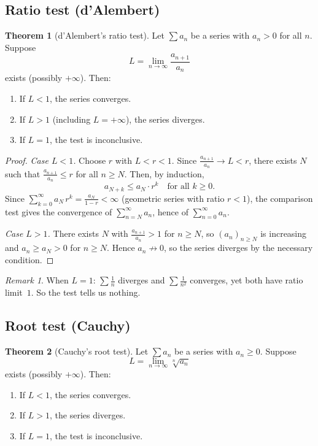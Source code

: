 \documentclass[12pt,a4paper,openany]{book}
\theoremstyle{definition}
\newtheorem{theorem}{Theorem}[chapter]
\theoremstyle{remark}
\newtheorem{remark}{Remark}[chapter]
\begin{document}
\subsection{Ratio test (d'Alembert)}\label{subsec:ratio}

\begin{theorem}[d'Alembert's ratio test]\label{thm:ratio-test}
Let $\sum a_n$ be a series with $a_n > 0$ for all $n$. Suppose
\[
   L = \lim_{n\to\infty}\frac{a_{n+1}}{a_n}
\]
exists (possibly $+\infty$). Then:
\begin{enumerate}
\item If $L < 1$, the series converges.
\item If $L > 1$ (including $L = +\infty$), the series diverges.
\item If $L = 1$, the test is inconclusive.
\end{enumerate}
\end{theorem}

\begin{proof}
\textit{Case $L < 1$.}
Choose $r$ with $L < r < 1$. Since $\frac{a_{n+1}}{a_n} \to L < r$,
there exists $N$ such that $\frac{a_{n+1}}{a_n} \leq r$ for all $n \geq N$.
Then, by induction,
\[
   a_{N+k} \leq a_N \cdot r^k \quad \text{for all } k \geq 0.
\]
Since $\sum_{k=0}^{\infty} a_N\, r^k = \frac{a_N}{1-r} < \infty$ (geometric
series with ratio $r < 1$), the comparison test gives the convergence of
$\sum_{n=N}^{\infty} a_n$, hence of $\sum_{n=0}^{\infty} a_n$.

\medskip
\textit{Case $L > 1$.}
There exists $N$ with $\frac{a_{n+1}}{a_n} > 1$ for $n \geq N$, so
$(a_n)_{n\geq N}$ is increasing and $a_n \geq a_N > 0$ for $n \geq N$.
Hence $a_n \not\to 0$, so the series diverges by the necessary condition.
\end{proof}

\begin{remark}
When $L = 1$: $\sum\frac{1}{n}$ diverges and $\sum\frac{1}{n^2}$ converges,
yet both have ratio limit~$1$. So the test tells us nothing.
\end{remark}

\subsection{Root test (Cauchy)}\label{subsec:root}

\begin{theorem}[Cauchy's root test]\label{thm:root-test}
Let $\sum a_n$ be a series with $a_n \geq 0$. Suppose
\[
   L = \lim_{n\to\infty}\sqrt[n]{a_n}
\]
exists (possibly $+\infty$). Then:
\begin{enumerate}
\item If $L < 1$, the series converges.
\item If $L > 1$, the series diverges.
\item If $L = 1$, the test is inconclusive.
\end{enumerate}
\end{theorem}
\end{document}
